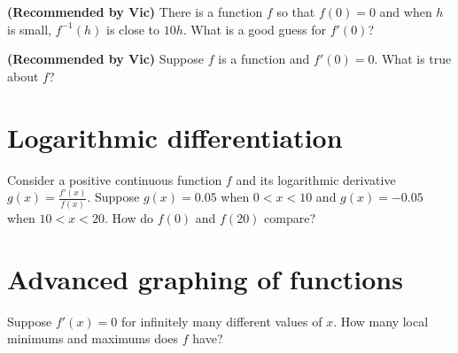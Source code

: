 \documentclass{ximera}
\newcommand{\recommendation}[1]{\textbf{(Recommended by #1)}}
\begin{document}
\begin{problem}
\recommendation{Vic}
  There is a function $f$ so that $f(0) = 0$ and when $h$ is small, $f^{-1}(h)$ is close to $10 h$.  What is a good guess for $f'(0)$?
  \begin{multipleChoice}
  \end{multipleChoice}
\end{problem}

\begin{problem}
\recommendation{Vic}
  Suppose $f$ is a function and $f'(0) = 0$.  What is true about $f$?
  \begin{multipleChoice}
  \end{multipleChoice}
\end{problem}

\clearpage

\section{Logarithmic differentiation}

\begin{problem}
  Consider a positive continuous function $f$ and its logarithmic derivative $g(x) = \frac{f'(x)}{f(x)}$.  Suppose $g(x) = 0.05$ when $0 < x < 10$ and $g(x) = -0.05$ when $10 < x < 20$.  How do $f(0)$ and $f(20)$ compare?
  \begin{multipleChoice}
  \end{multipleChoice}
\end{problem}

\clearpage

\section{Advanced graphing of functions}

\begin{problem}
  Suppose $f'(x) = 0$ for infinitely many different values of $x$.  How many local minimums and maximums does $f$ have?
  \begin{multipleChoice}
  \end{multipleChoice}
\end{problem}
\end{document}
